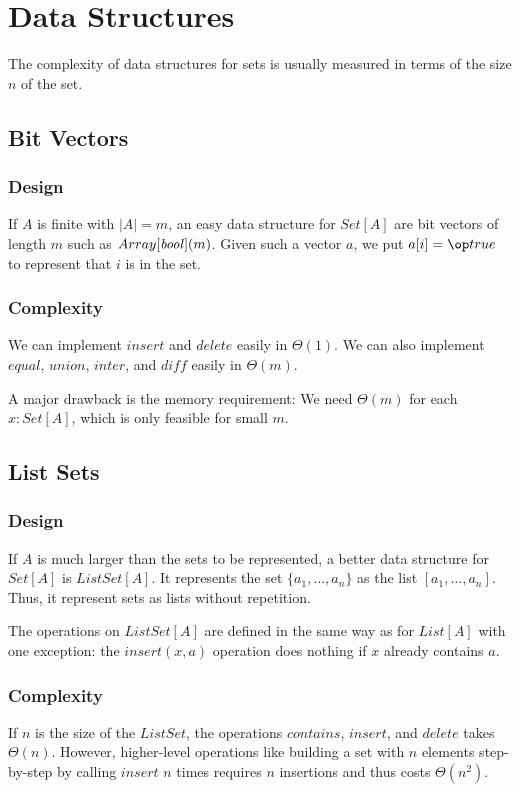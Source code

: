 \section{Data Structures}

The complexity of data structures for sets is usually measured in terms of the size $n$ of the set.

\subsection{Bit Vectors}\label{sec:ad:vectorset}

\subsubsection{Design}
If $A$ is finite with $|A|=m$, an easy data structure for $Set[A]$ are bit vectors of length $m$ such as $Array[\mathit{bool}](m)$.
Given such a vector $a$, we put $a[i]=\true$ to represent that $i$ is in the set.

\subsubsection{Complexity}
We can implement $insert$ and $delete$ easily in $\Theta(1)$.
We can also implement $equal$, $union$, $inter$, and $\mathit{diff}$ easily in $\Theta(m)$.

A major drawback is the memory requirement: We need $\Theta(m)$ for each $x:Set[A]$, which is only feasible for small $m$.

\subsection{List Sets}\label{sec:ad:listset}

\subsubsection{Design}
If $A$ is much larger than the sets to be represented, a better data structure for $Set[A]$ is $ListSet[A]$.
It represents the set $\{a_1,\ldots,a_n\}$ as the list $[a_1,\ldots,a_n]$.
Thus, it represent sets as lists without repetition.

The operations on $ListSet[A]$ are defined in the same way as for $List[A]$ with one exception: the $insert(x,a)$ operation does nothing if $x$ already contains $a$.

\subsubsection{Complexity}
If $n$ is the size of the $ListSet$, the operations $contains$, $insert$, and $delete$ takes $\Theta(n)$.
However, higher-level operations like building a set with $n$ elements step-by-step by calling $insert$ $n$ times requires $n$ insertions and thus costs $\Theta(n^2)$.

